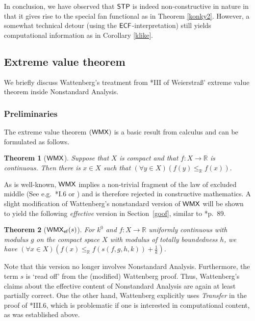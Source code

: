 \documentclass[reqno]{amsart}
\newtheorem{thm}{Theorem}
\def\STP{\textup{\textsf{STP}}}
\def\ef{\textup{\textsf{ef}}}
\def\R{{\mathbb  R}}
\def\R{{\mathbb{R}}}
\def\di{\rightarrow}
\def\eps{\varepsilon}
\def\WMX{\textup{\textsf{WMX}}}
\def\ECF{\textup{\textsf{ECF}}}
\numberwithin{equation}{section}
\numberwithin{thm}{section}
\begin{document}
\medskip

In conclusion, we have observed that $\STP$ is indeed non-constructive in nature in that it gives rise to the special fan functional 
as in Theorem \ref{konky2}.  However, a somewhat technical detour (using the $\ECF$-interpretation) still yields computational information as in Corollary \ref{klike}.


\subsection{Extreme value theorem}\label{compa2}
We briefly discuss Wattenberg's treatment from \cite{watje}*{III} of Weierstra\ss' extreme value theorem inside Nonstandard Analysis.  
\subsubsection{Preliminaries}
The extreme value theorem $(\WMX)$ is a basic result from calculus and can be formulated as follows.  %
\begin{thm}[$\WMX$]
Suppose that $X$ is compact and that $f:X\di \R$ is continuous. Then there is $x\in X$ such that $(\forall y\in X)(f(y)\leq_{\R}f(x))$.  
\end{thm}
As is well-known, $\WMX$ implies a non-trivial fragment of the law of excluded middle (See e.g.\ \cite{beeson1}*{I.6} or \cite{mandje}) and is therefore rejected in constructive mathematics.
A slight modification of Wattenberg's nonstandard version of $\WMX$ will be shown to yield the following \emph{effective} version in Section~\ref{goof}, similar to \cite{bish1}*{p.\ 89}.  
\begin{thm}[$\WMX_{\ef}(s)$]
For $k^{0}$ and $f:X\di \R$ uniformly continuous with modulus $g$ on the compact space $X$ with modulus of totally boundedness $h$, we have $(\forall x\in X)( f(x)\leq_{\R}f(s(f,g,h,k))+\frac{1}{k})$.
\end{thm}
Note that this version no longer involves Nonstandard Analysis.  Furthermore, the term $s$ is `read off' from the (modified) Wattenberg proof.  
Thus, Wattenberg's claims about the effective content of Nonstandard Analysis are again at least partially correct.   
One the other hand, Wattenberg explicitly uses \emph{Transfer} in the proof of \cite{watje}*{III.6}, which is problematic if one is interested in computational content, as was established above.
\end{document}
